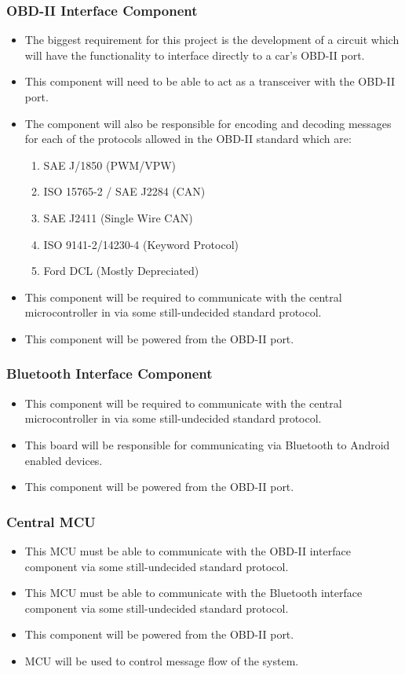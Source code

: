 \documentclass[12pt,letterpaper]{article}
\begin{document}
\subsubsection{OBD-II Interface Component}
\begin{itemize}
	\item The biggest requirement for this project is the development of a circuit which will have the functionality to interface directly to a car's OBD-II port. 
	\item This component will need to be able to act as a transceiver with the OBD-II port.
	\item The component will also be responsible for encoding and decoding messages for each of the protocols allowed in the OBD-II standard which are:
	\begin{enumerate}
		\item SAE J/1850 (PWM/VPW)
		\item ISO 15765-2 / SAE J2284 (CAN)
		\item SAE J2411 (Single Wire CAN)
		\item ISO 9141-2/14230-4 (Keyword Protocol)
		\item Ford DCL (Mostly Depreciated) 
	\end{enumerate}
	\item This component will be required to communicate with the central microcontroller in via some still-undecided standard protocol.
	\item This component will be powered from the OBD-II port.
\end{itemize}

\subsubsection{Bluetooth Interface Component}
\begin{itemize}
	\item This component will be required to communicate with the central microcontroller in via some still-undecided standard protocol.
	\item This board will be responsible for communicating via Bluetooth to Android enabled devices.
	\item This component will be powered from the OBD-II port.
\end{itemize}

\subsubsection{Central MCU}
\begin{itemize}
	\item This MCU must be able to communicate with the OBD-II interface component via some still-undecided standard protocol.
	\item This MCU must be able to communicate with the Bluetooth interface component via some still-undecided standard protocol.
	\item This component will be powered from the OBD-II port.
	\item MCU will be used to control message flow of the system.
\end{itemize} 
\end{document}
